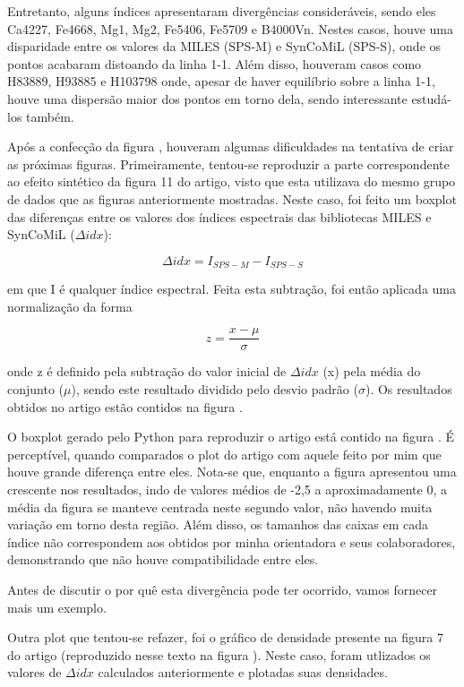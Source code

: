 \documentclass[12pt]{projeto}
\begin{document}
Entretanto, alguns índices apresentaram divergências consideráveis, sendo eles Ca4227, Fe4668, Mg1, Mg2, Fe5406, Fe5709 e B4000Vn. Nestes casos, houve uma disparidade entre os valores da MILES (SPS-M) e SynCoMiL (SPS-S), onde os pontos acabaram distoando da linha 1-1. Além disso, houveram casos como H83889, H93885 e H103798 onde, apesar de haver equilíbrio sobre a linha 1-1, houve uma dispersão maior dos pontos em torno dela, sendo interessante estudá-los também. 


Após a confecção da figura , houveram algumas dificuldades na tentativa de criar as próximas figuras. Primeiramente, tentou-se reproduzir a parte correspondente ao efeito sintético da figura 11 do artigo, visto que esta utilizava do mesmo grupo de dados que as figuras anteriormente mostradas. Neste caso, foi feito um boxplot das diferenças entre os valores dos índices espectrais das bibliotecas MILES e SynCoMiL (\(\Delta idx\)):

\[\Delta idx = I_{SPS-M} - I_{SPS-S}\]

em que I é qualquer índice espectral. Feita esta subtração, foi então aplicada uma normalização da forma

\[z = \frac{x-\mu}{\sigma}\]

onde z é definido pela subtração do valor inicial de \(\Delta idx\) (x) pela média do conjunto (\(\mu\)), sendo este resultado dividido pelo desvio padrão (\(\sigma\)). Os resultados obtidos no artigo estão contidos na figura .

O boxplot gerado pelo Python para reproduzir o artigo está contido na figura .
É perceptível, quando comparados o plot do artigo com aquele feito por mim que houve grande diferença entre eles. Nota-se que, enquanto a figura  apresentou uma crescente nos resultados, indo de valores médios de -2,5 a aproximadamente 0, a média da figura  se manteve centrada neste segundo valor, não havendo muita variação em torno desta região. Além disso, os tamanhos das caixas em cada índice não correspondem aos obtidos por minha orientadora e seus colaboradores, demonstrando que não houve compatibilidade entre eles.

Antes de discutir o por quê esta divergência pode ter ocorrido, vamos fornecer mais um exemplo.

Outra plot que tentou-se refazer, foi o gráfico de densidade presente na figura 7 do artigo (reproduzido nesse texto na figura ). Neste caso, foram utlizados os valores de \(\Delta idx\) calculados anteriormente e plotadas suas densidades.
\end{document}
